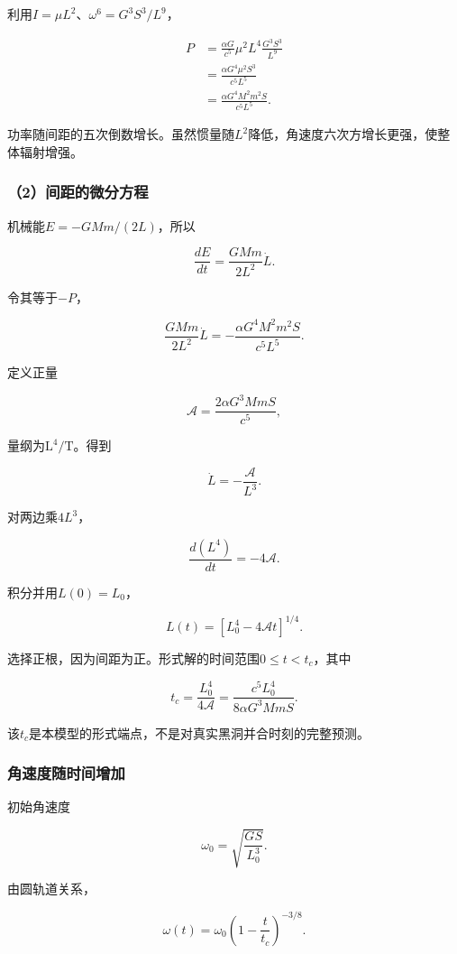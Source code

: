 \documentclass[12pt,a4paper,fontset=fandol]{ctexart}
\begin{document}
利用\(I=\mu L^2\)、\(\omega^6=G^3S^3/L^9\)，

\[
\begin{aligned}
P
&=\frac{\alpha G}{c^5}
\mu^2L^4\frac{G^3S^3}{L^9}\\
&=\frac{\alpha G^4\mu^2S^3}{c^5L^5}\\
&=\boxed{\frac{\alpha G^4M^2m^2S}{c^5L^5}}.
\end{aligned}
\]

功率随间距的五次倒数增长。虽然惯量随\(L^2\)降低，角速度六次方增长更强，使整体辐射增强。

\subsubsection{（2）间距的微分方程}\label{ux95f4ux8dddux7684ux5faeux5206ux65b9ux7a0b}

机械能\(E=-GMm/(2L)\)，所以

\[
\frac{dE}{dt}
=\frac{GMm}{2L^2}\dot L.
\]

令其等于\(-P\)，

\[
\frac{GMm}{2L^2}\dot L
=-\frac{\alpha G^4M^2m^2S}{c^5L^5}.
\]

定义正量

\[
\boxed{\mathcal A=\frac{2\alpha G^3MmS}{c^5}},
\]

量纲为\(\mathrm{L^4/T}\)。得到

\[
\boxed{\dot L=-\frac{\mathcal A}{L^3}}.
\]

对两边乘\(4L^3\)，

\[
\frac{d(L^4)}{dt}=-4\mathcal A.
\]

积分并用\(L(0)=L_0\)，

\[
\boxed{L(t)=[L_0^4-4\mathcal A t]^{1/4}}.
\]

选择正根，因为间距为正。形式解的时间范围\(0\leq t<t_c\)，其中

\[
\boxed{
t_c=\frac{L_0^4}{4\mathcal A}
=\frac{c^5L_0^4}{8\alpha G^3MmS}}.
\]

该\(t_c\)是本模型的形式端点，不是对真实黑洞并合时刻的完整预测。

\subsubsection{角速度随时间增加}\label{ux89d2ux901fux5ea6ux968fux65f6ux95f4ux589eux52a0}

初始角速度

\[
\omega_0=\sqrt{\frac{GS}{L_0^3}}.
\]

由圆轨道关系，

\[
\boxed{
\omega(t)=\omega_0
\left(1-\frac t{t_c}\right)^{-3/8}}.
\]
\end{document}
